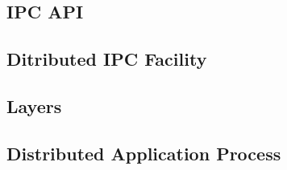 \documentclass[aspectratio=169]{beamer}
\begin{document}
\subsection{IPC API}
\subsection{Ditributed IPC Facility}
\subsection{Layers}
\subsection{Distributed Application Process}
\end{document}
